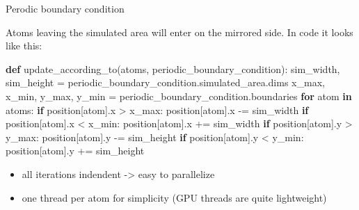 \documentclass[ignorenonframetext,]{beamer}
\newenvironment{Shaded}{}{}
\newcommand{\ControlFlowTok}[1]{\textcolor[rgb]{0.00,0.44,0.13}{\textbf{#1}}}
\newcommand{\KeywordTok}[1]{\textcolor[rgb]{0.00,0.44,0.13}{\textbf{#1}}}
\newcommand{\NormalTok}[1]{#1}
\newcommand{\OperatorTok}[1]{\textcolor[rgb]{0.40,0.40,0.40}{#1}}
\providecommand{\tightlist}{%
  \setlength{\itemsep}{0pt}\setlength{\parskip}{0pt}}
\begin{document}
\begin{frame}[fragile]

\begin{block}{Perodic boundary condition}

Atoms leaving the simulated area will enter on the mirrored side. In
code it looks like this:

\begin{Shaded}
\begin{Highlighting}[]
\KeywordTok{def}\NormalTok{ update_according_to(atoms, periodic_boundary_condition):}
\NormalTok{  sim_width, sim_height }\OperatorTok{=}\NormalTok{ periodic_boundary_condition.simulated_area.dims}
\NormalTok{  x_max, x_min, y_max, y_min }\OperatorTok{=}\NormalTok{ periodic_boundary_condition.boundaries}
  \ControlFlowTok{for}\NormalTok{ atom }\KeywordTok{in}\NormalTok{ atoms:}
    \ControlFlowTok{if}\NormalTok{ position[atom].x }\OperatorTok{>}\NormalTok{ x_max:}
\NormalTok{      position[atom].x }\OperatorTok{-=}\NormalTok{ sim_width}
    \ControlFlowTok{if}\NormalTok{ position[atom].x }\OperatorTok{<}\NormalTok{ x_min:}
\NormalTok{      position[atom].x }\OperatorTok{+=}\NormalTok{ sim_width}
    \ControlFlowTok{if}\NormalTok{ position[atom].y }\OperatorTok{>}\NormalTok{ y_max:}
\NormalTok{      position[atom].y }\OperatorTok{-=}\NormalTok{ sim_height}
    \ControlFlowTok{if}\NormalTok{ position[atom].y }\OperatorTok{<}\NormalTok{ y_min:}
\NormalTok{      position[atom].y }\OperatorTok{+=}\NormalTok{ sim_height}
\end{Highlighting}
\end{Shaded}

\begin{itemize}
\tightlist
\item
  all iterations indendent -\textgreater{} easy to parallelize
\item
  one thread per atom for simplicity (GPU threads are quite lightweight)
\end{itemize}

\end{block}

\end{frame}
\end{document}
